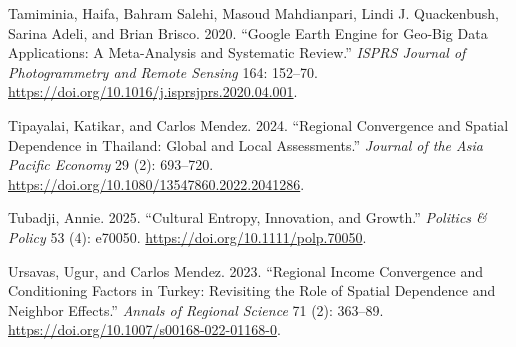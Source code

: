 \documentclass[
  letterpaper,
  DIV=11,
  numbers=noendperiod]{scrartcl}
\newlength{\cslhangindent}
\newenvironment{CSLReferences}[2] %
 {\begin{list}{}{%
  \setlength{\itemindent}{0pt}
  \setlength{\leftmargin}{0pt}
  \setlength{\parsep}{0pt}
  \ifodd #1
   \setlength{\leftmargin}{\cslhangindent}
   \setlength{\itemindent}{-1\cslhangindent}
  \fi
  \setlength{\itemsep}{#2\baselineskip}}}
 {\end{list}}
\begin{document}
\begin{CSLReferences}{1}{0}
Tamiminia, Haifa, Bahram Salehi, Masoud Mahdianpari, Lindi J.
Quackenbush, Sarina Adeli, and Brian Brisco. 2020. {``Google {E}arth
{E}ngine for Geo-Big Data Applications: A Meta-Analysis and Systematic
Review.''} \emph{ISPRS Journal of Photogrammetry and Remote Sensing}
164: 152--70. \url{https://doi.org/10.1016/j.isprsjprs.2020.04.001}.

Tipayalai, Katikar, and Carlos Mendez. 2024. {``Regional Convergence and
Spatial Dependence in {Thailand}: {Global} and Local Assessments.''}
\emph{Journal of the Asia Pacific Economy} 29 (2): 693--720.
\url{https://doi.org/10.1080/13547860.2022.2041286}.

Tubadji, Annie. 2025. {``Cultural Entropy, Innovation, and Growth.''}
\emph{Politics \& Policy} 53 (4): e70050.
\url{https://doi.org/10.1111/polp.70050}.

Ursavas, Ugur, and Carlos Mendez. 2023. {``Regional Income Convergence
and Conditioning Factors in {Turkey}: {Revisiting} the Role of Spatial
Dependence and Neighbor Effects.''} \emph{Annals of Regional Science} 71
(2): 363--89. \url{https://doi.org/10.1007/s00168-022-01168-0}.

\end{CSLReferences}
\end{document}
